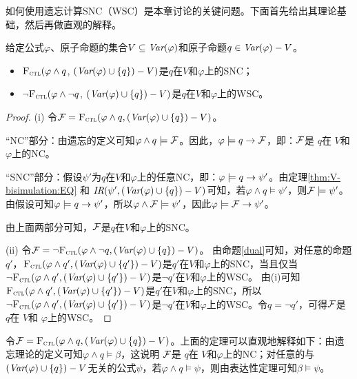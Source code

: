 如何使用遗忘计算SNC（WSC）是本章讨论的关键问题。下面首先给出其理论基础，然后再做直观的解释。

\begin{theorem}\label{thm:SNC:WSC:forget}
	给定公式$\varphi$、原子命题的集合$V\subseteq\textit{Var}(\varphi)$和原子命题$q\in\textit{Var}(\varphi)- V$。
	\begin{itemize}
		\item[(i)] ${\textsc{F}_{\textsc{ctl}}} (\varphi \land q$, $(\textit{Var}(\varphi) \cup \{q\}) - V)$是$q$在$V$和$\varphi$上的SNC；
		\item[(ii)]  $\neg{\textsc{F}_{\textsc{ctl}}} (\varphi \land \neg q$, $(\textit{Var}(\varphi) \cup \{q\}) - V)$是$q$在$V$和$\varphi$上的WSC。
	\end{itemize}
\end{theorem}
\begin{proof}
	(i) 令${\cal F}={\textsc{F}_{\textsc{ctl}}}(\varphi \wedge q, (\textit{Var}(\varphi) \cup \{q\})- V)$。
	
	
	“NC”部分：由遗忘的定义可知$\varphi \wedge q \models {\cal F}$。因此，$\varphi\models q \rightarrow {\cal F}$，即：${\cal F}$是 $q$在 $V$和$\varphi$上的NC。
	
	“SNC”部分：假设$\psi'$为$q$在$V$和$\varphi$上的任意NC，即：$\varphi\models q \rightarrow \psi'$。由定理\ref{thm:V-bisimulation:EQ} 和 $\emph{IR}(\psi', (\textit{Var}(\varphi) \cup \{q\})- V)$可知，若$\varphi \wedge q \models \psi'$，则${\cal F} \models \psi'$。
	由假设可知$\varphi\models q \rightarrow \psi'$，所以$\varphi \wedge {\cal F} \models \psi'$，因此$\varphi \models {\cal F} \rightarrow \psi'$。
	
	由上面两部分可知，${\cal F}$是$q$在$V$和$\varphi$上的SNC。
	
	(ii) 令${\cal F}=\neg {\textsc{F}_{\textsc{ctl}}}(\varphi \wedge \neg q, (\textit{Var}(\varphi) \cup \{q\})- V)$。
	由命题\ref{dual}可知，对任意的命题$q'$，${\textsc{F}_{\textsc{ctl}}}(\varphi \wedge q', (\textit{Var}(\varphi) \cup \{q'\})- V)$是$q'$在$V$和$\varphi$上的SNC，当且仅当
	$\neg {\textsc{F}_{\textsc{ctl}}}(\varphi \wedge q', (\textit{Var}(\varphi) \cup \{q'\})- V)$是$\neg q'$在$V$和$\varphi$上的WSC。
	由(i)可知${\textsc{F}_{\textsc{ctl}}}(\varphi \wedge q', (\textit{Var}(\varphi) \cup \{q'\})- V)$是$q'$在$V$和$\varphi$上的SNC，所以$\neg {\textsc{F}_{\textsc{ctl}}}(\varphi \wedge q', (\textit{Var}(\varphi) \cup \{q'\})- V)$是$\neg q'$在$V$和$\varphi$上的WSC。令$q=\neg q'$，可得${\cal F}$是 $q$在 $V$和 $\varphi$上的WSC。
\end{proof}

令${\cal F}={\textsc{F}_{\textsc{ctl}}}(\varphi \wedge q, (\textit{Var}(\varphi) \cup \{q\})- V)$。上面的定理可以直观地解释如下：由遗忘理论的定义可知$\varphi \wedge q \models \beta$，这说明
${\cal F}$是 $q$在 $V$和$\varphi$上的NC；对任意的与$(\textit{Var}(\varphi) \cup \{q\})- V$无关的公式$\psi$，若$\varphi \wedge q \models \psi$，则由表达性定理可知$\beta \models \psi$。

